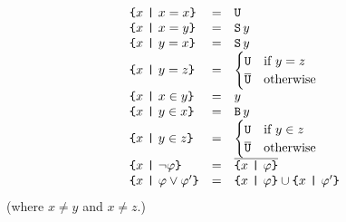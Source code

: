 \documentclass[sigplan,10pt,anonymous,review]{acmart}%
\begin{document}
\[\begin{array}{lcll}
  \Compr x {x = x} & = & \Universe \\
  \Compr x {x = y} & = & \Sing y \\
  \Compr x {y = x} & = & \Sing y \\
  \Compr x {y = z} & = &
    \begin{cases}
      \Universe & \text{if } y = z\\
      \Complement \Universe & \text{otherwise}
    \end{cases}\\
  \Compr x {x \in y} & = & y \\
  \Compr x {y \in x} & = & \Essence y \\
  \Compr x {y \in z} & = &
    \begin{cases}
      \Universe & \text{if } y \in z\\
      \Complement \Universe & \text{otherwise}
    \end{cases}\\
  \Compr x {\neg\varphi} & = & \Complement {\Compr x \varphi} \\
  \Compr x {\varphi \lor \varphi'} & = & \Union {\Compr x \varphi} {\Compr x {\varphi'}} \\
\end{array}\]
(where $x\neq y$ and $x \neq z$.)
\end{document}
